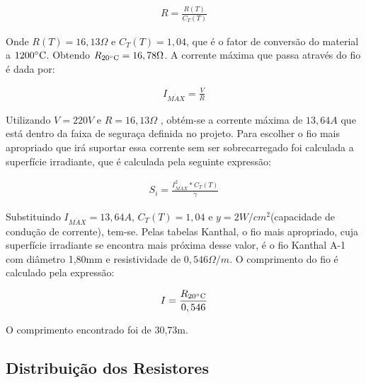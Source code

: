 \begin{align}
R = \frac{R(T)}{C_T(T)}
\end{align}

Onde $R(T)=16,13\Omega$ e $C_{T}(T)=1,04$, que é o fator de conversão do material a $1200\degree \text{C}$. Obtendo $R_{20\degree \text{C}}=16,78\Omega$.
A corrente máxima que passa através do fio é dada por:

\begin{align}
I_{M\acute{A}X} = \frac{V}{R}
\end{align}

Utilizando $V=220V$ e $R=16,13\Omega$ , obtém-se a corrente máxima de $13,64 A$ que está dentro da faixa de seguraça definida no projeto. Para escolher o fio mais apropriado que irá suportar essa corrente sem ser sobrecarregado foi calculada a superfície irradiante, que é calculada pela seguinte expressão:

\begin{align}
S_i = \frac{I_{M\acute{A}X}^{2}*C_T(T)}{\gamma}
\end{align}

Substituindo $I_{M\acute{A}X}=13,64A$, $C_T(T)=1,04$ e $y=2W/cm^{2}$(capacidade de condução de corrente), tem-se. Pelas tabelas Kanthal, o fio mais apropriado, cuja superfície irradiante se encontra mais próxima desse valor, é o fio Kanthal A-1 com diâmetro 1,80mm e resistividade de $0,546\Omega /m$. O comprimento do fio é calculado pela expressão:

\begin{align}
I= \frac{R_{20 \degree \text{C}}}{0,546}
\end{align}

O comprimento encontrado foi de 30,73m.

\subsection{Distribuição dos Resistores}

